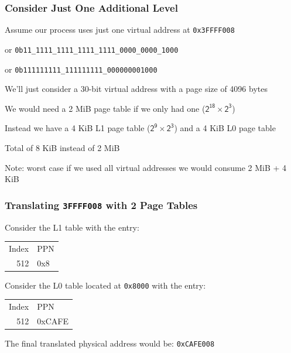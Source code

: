   \begin{frame}
    \frametitle{Consider Just One Additional Level}

    Assume our process uses just one virtual address at \texttt{0x3FFFF008}

    \hspace{2em} or \texttt{0b11\_1111\_1111\_1111\_1111\_0000\_0000\_1000}

    \hspace{2em} or \texttt{0b111111111\_111111111\_000000001000}

    \vspace{2em}

    We'll just consider a 30-bit virtual address with a page size of 4096 bytes

    \hspace{2em} We would need a 2 MiB page table if we only had one ($\mathsf{2^{18} \times 2^{3}}$)

    \vspace{2em}

    Instead we have a 4 KiB L1 page table ($\mathsf{2^9 \times 2^{3}}$) and a 4 KiB L0 page table

    \hspace{2em} Total of 8 KiB instead of 2 MiB

    \vspace{2em}

    Note: worst case if we used all virtual addresses we would consume 2 MiB + 4 KiB
  \end{frame}

  \begin{frame}
    \frametitle{Translating \texttt{3FFFF008} with 2 Page Tables}

    Consider the L1 table with the entry:

    \begin{center}
    {\ttfamily
    \begin{tabular}{rl}
      Index & PPN \\
      512   & 0x8 \\
    \end{tabular}}
    \end{center}
      
    Consider the L0 table located at \texttt{0x8000} with the entry:

    \begin{center}
    {\ttfamily
    \begin{tabular}{rl}
      Index & PPN \\
      512   & 0xCAFE \\
    \end{tabular}}
    \end{center}
    
    The final translated physical address would be: \texttt{0xCAFE008}
  \end{frame}

